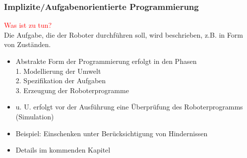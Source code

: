 \subsubsection{Implizite/Aufgabenorientierte Programmierung}
\textcolor{red}{\glqq Was ist zu tun?\grqq} \\
Die Aufgabe, die der Roboter durchführen soll, wird beschrieben, z.B. in Form von Zuständen.
\begin{itemize}
\item Abstrakte Form der Programmierung erfolgt in den Phasen\\
1. Modellierung der Umwelt\\
2. Spezifikation der Aufgaben\\
3. Erzeugung der Roboterprogramme
\item u. U. erfolgt vor der Ausführung eine Überprüfung des
Roboterprogramms (Simulation)
\item Beispiel: Einschenken unter Berücksichtigung von Hindernissen
\item Details im kommenden Kapitel
\end{itemize}